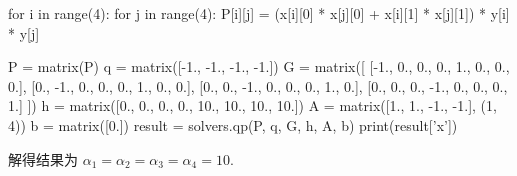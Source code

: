 \documentclass[11pt,letter,notitlepage]{article}
\begin{document}
\begin{solution}
\begin{enumerate}
\begin{python}
			      for i in range(4):
			      for j in range(4):
			      P[i][j] = (x[i][0] * x[j][0] + x[i][1] * x[j][1]) * y[i] * y[j]

			      P = matrix(P)
			      q = matrix([-1., -1., -1., -1.])
			      G = matrix([
					      [-1., 0., 0., 0., 1., 0., 0., 0.],
					      [0., -1., 0., 0., 0., 1., 0., 0.],
					      [0., 0., -1., 0., 0., 0., 1., 0.],
					      [0., 0., 0., -1., 0., 0., 0., 1.]
				      ])
			      h = matrix([0., 0., 0., 0., 10., 10., 10., 10.])
			      A = matrix([1., 1., -1., -1.], (1, 4))
			      b = matrix([0.])
			      result = solvers.qp(P, q, G, h, A, b)
			      print(result['x'])
		      \end{python}
		      解得结果为 $\alpha_1=\alpha_2=\alpha_3=\alpha_4=10$.

	\end{enumerate}
\end{solution}


\end{document}
